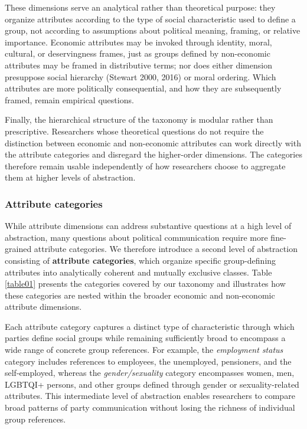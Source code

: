 \documentclass[12pt]{article}
\begin{document}
These dimensions serve an analytical rather than theoretical purpose: they organize attributes according to the type of social characteristic used to define a group, not according to assumptions about political meaning, framing, or relative importance.
Economic attributes may be invoked through identity, moral, cultural, or deservingness frames, just as groups defined by non-economic attributes may be framed in distributive terms; nor does either dimension presuppose social hierarchy (Stewart 2000, 2016) or moral ordering.
Which attributes are more politically consequential, and how they are subsequently framed, remain empirical questions.



Finally, the hierarchical structure of the taxonomy is modular rather than prescriptive.
Researchers whose theoretical questions do not require the distinction between economic and non-economic attributes can work directly with the attribute categories and disregard the higher-order dimensions.
The categories therefore remain usable independently of how researchers choose to aggregate them at higher levels of abstraction.





\subsubsection{Attribute categories}\label{attribute-categories}

While attribute dimensions can address substantive questions at a high level of abstraction, many questions about political communication require more fine-grained attribute categories.
We therefore introduce a second level of abstraction consisting of \textbf{attribute categories}, which organize specific group-defining attributes into analytically coherent and mutually exclusive classes.
Table \ref{table01} presents the categories covered by our taxonomy and illustrates how these categories are nested within the broader economic and non-economic attribute dimensions.

Each attribute category captures a distinct type of characteristic through which parties define social groups while remaining sufficiently broad to encompass a wide range of concrete group references.
For example, the \emph{employment status} category includes references to employees, the unemployed, pensioners, and the self-employed, whereas the \emph{gender/sexuality} category encompasses women, men, LGBTQI+ persons, and other groups defined through gender or sexuality-related attributes.
This intermediate level of abstraction enables researchers to compare broad patterns of party communication without losing the richness of individual group references.
\end{document}
